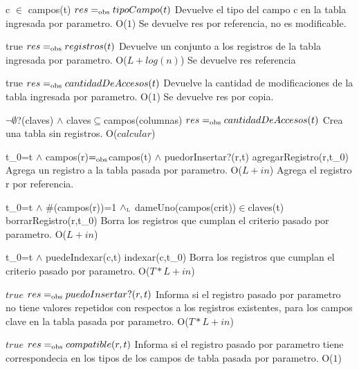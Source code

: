  {c $\in$ campos(t)}
 {$res =_{\mathrm{obs}} tipoCampo(t)$}
 {Devuelve el tipo del campo c en la tabla ingresada por parametro.}
 {O($1$)}
 {Se devuelve res por referencia, no es modificable.}
 
 {true}
 {$res =_{\mathrm{obs}} registros(t)$}
 {Devuelve un conjunto a los registros de la tabla ingresada por parametro.}
 {O($L + log(n)$) } %
 {Se devuelve res referencia}

 
 {true}
 {$res =_{\mathrm{obs}} cantidadDeAccesos(t)$}
 {Devuelve la cantidad de modificaciones de la tabla ingresada por parametro.}
 {O($1$)}
 {Se devuelve res por copia.}

 
 
 {$\neg\emptyset$?(claves) $\land$ claves$\subseteq$campos(columnas)}
 {$res =_{\mathrm{obs}} cantidadDeAccesos(t)$}
 {Crea una tabla sin registros.}
 {O($calcular$)}
 {}

 {t\_0=t $\land$ campos(r)$=_{\mathrm{obs}}$campos(t) $\land$ puedorInsertar?(r,t)}
 {agregarRegistro(r,t\_0)}
 {Agrega un registro a la tabla pasada por parametro.}
 {O($L + in$)}
 {Agrega el registro r por referencia.} 
 
 {t\_0=t $\land$ $\#$(campos(r))=1 $\land_{\mathrm{\scriptscriptstyle{L}}}$ dameUno(campos(crit))$\in$claves(t)}
 {borrarRegistro(r,t\_0)}
 {Borra los registros que cumplan el criterio pasado por parametro.}
 {O($L + in$)}
 {} 
 
 {t\_0=t $\land$ puedeIndexar(c,t)}
 {indexar(c,t\_0)}
 {Borra los registros que cumplan el criterio pasado por parametro.}
 {O($T*L + in$)}
 {} 	
 

 {$true$}
 {$res =_{\mathrm{obs}} puedoInsertar?(r,t)$}
 {Informa si el registro pasado por parametro no tiene valores repetidos con respectos a los registros existentes, para los campos clave en la tabla pasada por parametro.}
 {O($T*L + in$)}
 {} 
 
 {$true$}
 {$res =_{\mathrm{obs}} compatible(r,t)$}
 {Informa si el registro pasado por parametro tiene correspondecia en los tipos de los campos de tabla pasada por parametro.}
 {O($1$)}
 {} 
 
